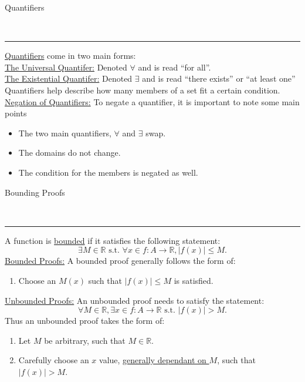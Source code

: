 \documentclass{article}
\newcommand{\suchthat}{\textrm{ s.t. }}
\newcommand{\header}[1]{\begin{large}\noindent #1\end{large}\\\rule{\textwidth}{0.5pt}}
\newcommand{\gap}{\medskip\\}
\newcommand{\sheader}[1]{\underline{#1:}}
\begin{document}
\header{Quantifiers}
\underline{Quantifiers} come in two main forms:
\gap
\sheader{The Universal Quantifer} Denoted $\forall$ and is read ``for all''.
\gap
\sheader{The Existential Quantifer} Denoted $\exists$ and is read ``there exists'' or ``at least one''
\gap
Quantifiers help describe how many members of a set fit a certain condition.
\gap
\sheader{Negation of Quantifiers} To negate a quantifier, it is important to note some
main points
\begin{itemize}
    \item The two main quantifiers, $\forall$ and $\exists$ swap.
    \item The domains do not change.
    \item The condition for the members is negated as well.
\end{itemize} 

\header{Bounding Proofs}
A function is \underline{bounded} if it satisfies the following statement:
\[
    \exists M \in \mathbb{R} \suchthat \forall x \in f: A \to \mathbb{R}, |f(x)| \leq M.
\]
\sheader{Bounded Proofs} A bounded proof generally follows the form of:
\begin{enumerate}
    \item Choose an $M(x)$ such that $|f(x)| \leq M$ is satisfied. 
\end{enumerate}
\sheader{Unbounded Proofs} An unbounded proof needs to satisfy the statement:
\[
    \forall M \in \mathbb{R}, \exists x \in f:A \to \mathbb{R} \suchthat |f(x)| > M.
\]
Thus an unbounded proof takes the form of:
\begin{enumerate}
    \item Let $M$ be arbitrary, such that $M \in \mathbb{R}$.
    \item Carefully choose an $x$ value, \underline{generally dependant on $M$}, such that
    $|f(x)| > M$.
\end{enumerate}
\end{document}
